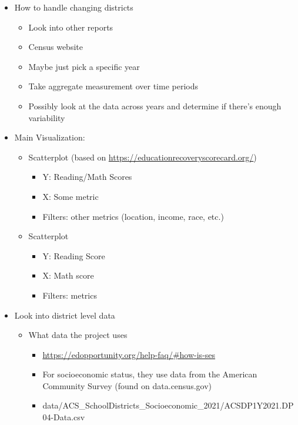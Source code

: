 \documentclass[
  letterpaper,
  DIV=11,
  numbers=noendperiod]{scrartcl}
\begin{document}
\begin{itemize}
\item
  How to handle changing districts

  \begin{itemize}
  \item
    Look into other reports
  \item
    Census website
  \item
    Maybe just pick a specific year
  \item
    Take aggregate measurement over time periods
  \item
    Possibly look at the data across years and determine if there's
    enough variability
  \end{itemize}
\item
  Main Visualization:

  \begin{itemize}
  \item
    Scatterplot (based on \url{https://educationrecoveryscorecard.org/})

    \begin{itemize}
    \item
      Y: Reading/Math Scores
    \item
      X: Some metric
    \item
      Filters: other metrics (location, income, race, etc.)
    \end{itemize}
  \item
    Scatterplot

    \begin{itemize}
    \item
      Y: Reading Score
    \item
      X: Math score
    \item
      Filters: metrics
    \end{itemize}
  \end{itemize}
\item
  Look into district level data

  \begin{itemize}
  \item
    What data the project uses

    \begin{itemize}
    \item
      \url{https://edopportunity.org/help-faq/\#how-is-ses}
    \item
      For socioeconomic status, they use data from the American
      Community Survey (found on data.census.gov)
    \item
      data/ACS\_SchoolDistricts\_Socioeconomic\_2021/ACSDP1Y2021.DP04-Data.csv


\end{itemize}
\end{itemize}
\end{itemize}
\end{document}

